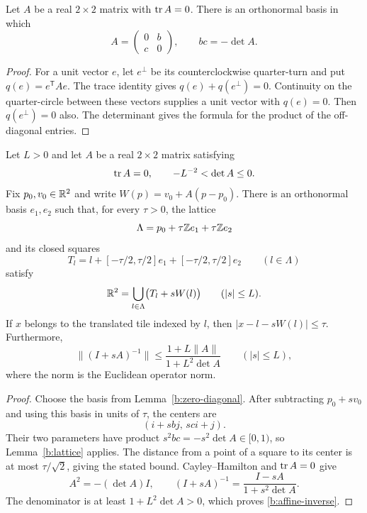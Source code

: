 \begin{lemma}\label{b:zero-diagonal}
Let $A$ be a real $2\times2$ matrix with $\operatorname{tr} A=0$.
There is an orthonormal basis in which
\[
 A=\begin{pmatrix}0&b\\c&0\end{pmatrix},\qquad bc=-\det A.
\]
\end{lemma}
\begin{proof}
For a unit vector $e$, let $e^\perp$ be its counterclockwise
quarter-turn and put $q(e)=e^{\mathsf T}Ae$. The trace identity
gives $q(e)+q(e^\perp)=0$. Continuity on the quarter-circle
between these vectors supplies a unit vector with $q(e)=0$.
Then $q(e^\perp)=0$ also. The determinant gives the formula for
the product of the off-diagonal entries.
\end{proof}

\begin{lemma}\label{b:affine-cover}
Let $L>0$ and let $A$ be a real $2\times2$ matrix satisfying
\[
 \operatorname{tr} A=0,\qquad -L^{-2}<\det A\le0.
\]
Fix $p_0,v_0\in\mathbb R^2$ and write $W(p)=v_0+A(p-p_0)$.
There is an orthonormal basis $e_1,e_2$ such that, for every
$\tau>0$, the lattice
\[
 \Lambda=p_0+\tau\mathbb Z e_1+\tau\mathbb Z e_2
\]
and its closed squares
\[
 T_l=l+[-\tau/2,\tau/2]e_1+[-\tau/2,\tau/2]e_2
 \qquad(l\in\Lambda)
\]
satisfy
\[
 \mathbb R^2=\bigcup_{l\in\Lambda}\bigl(T_l+sW(l)\bigr)
 \qquad(|s|\le L).
\]
If $x$ belongs to the translated tile indexed by $l$, then
$|x-l-sW(l)|\le\tau$. Furthermore,
\begin{equation}\label{b:affine-inverse}
 \|(I+sA)^{-1}\|
 \le \frac{1+L\|A\|}{1+L^2\det A}
 \qquad(|s|\le L),
\end{equation}
where the norm is the Euclidean operator norm.
\end{lemma}
\begin{proof}
Choose the basis from Lemma~\ref{b:zero-diagonal}. After subtracting
$p_0+sv_0$ and using this basis in units of $\tau$, the centers are
\[
 (i+sbj,\,sci+j).
\]
Their two parameters have product $s^2bc=-s^2\det A\in[0,1)$,
so Lemma~\ref{b:lattice} applies. The distance from a point of a
square to its center is at most $\tau/\sqrt2$, giving the stated
bound. Cayley--Hamilton and $\operatorname{tr} A=0$ give
\[
 A^2=-(\det A)I,\qquad
 (I+sA)^{-1}=\frac{I-sA}{1+s^2\det A}.
\]
The denominator is at least $1+L^2\det A>0$, which proves
\eqref{b:affine-inverse}.
\end{proof}

